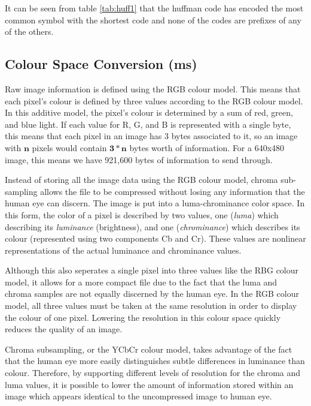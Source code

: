 It can be seen from table \ref{tab:huff1} that the huffman code has encoded the most common symbol with the shortest code and none of the codes are prefixes of any of the others.

\subsection{Colour Space Conversion (ms)}
\label{sec:colour_space_conversion}
Raw image information is defined using the RGB colour model.
This means that each pixel's colour is defined by three values according to the RGB colour model. 
In this additive model, the pixel's colour is determined by a sum of red, green, and blue light. 
If each value for R, G, and B is represented with a single byte, 
this means that each pixel in an image has 3 bytes associated to it, so 
an image with $\mathbf{n}$ pixels would contain $\mathbf{3*n}$ bytes worth of information. 
For a 640x480 image, this means we have 921,600 bytes of information to send through.

Instead of storing all the image data using the RGB colour model, 
chroma sub-sampling allows the file to be compressed
without losing any information that the human eye can discern. 
The image is put into  a luma-chrominance color space. 
In this form, the color of a pixel is described by two values, 
one (\emph{luma}) which describing its \emph{luminance} (brightness), and 
one (\emph{chrominance}) which describes its colour 
(represented using two components Cb and Cr).
These values are nonlinear representations
of the actual luminance and chrominance values.\cite{kerr_chroma_subsampling}

Although this also seperates a single pixel into three values like the RBG colour model, 
it allows for a more compact file due to the fact that the luma and chroma samples 
are not equally discerned by the human eye. 
In the RGB colour model, all three values must be taken at 
the same resolution in order to display the colour of one pixel. 
Lowering the resolution in this colour space quickly reduces the quality of an image. 

Chroma subsampling, or the YCbCr colour model, takes advantage of the fact that the human eye 
more easily distinguishes subtle differences in luminance than colour. \cite{kerr_chroma_subsampling} 
Therefore, by supporting different levels of resolution for the chroma and luma values, 
it is possible to lower the amount of information stored 
within an image which appears identical to the uncompressed image to human eye.

